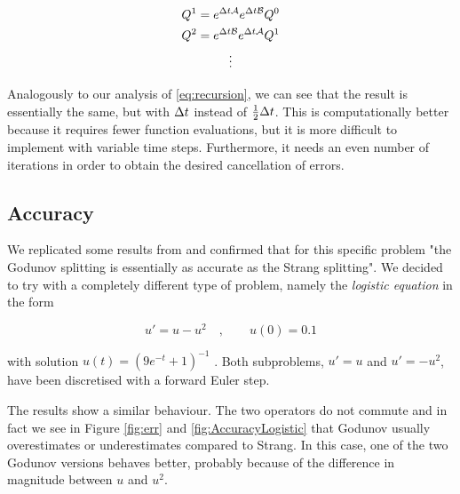 \documentclass[journal,onecolumn]{IEEEtran}
\begin{document}
\begin{equation}
	\begin{gathered}
		Q^1 = e^{\Delta t\mathcal{A}}e^{\Delta t\mathcal{B}}Q^0\\
		Q^2 = e^{\Delta t\mathcal{B}}e^{\Delta t\mathcal{A}}Q^1\\
		\vdots
	\end{gathered}
\end{equation}

Analogously to our analysis of \eqref{eq:recursion}, we can see that the result is essentially the same, but with $\Delta t$ instead of $\frac{1}{2}\Delta t$. This is computationally better because it requires fewer function evaluations, but it is more difficult to implement with variable time steps. Furthermore, it needs an even number of iterations in order to obtain the desired cancellation of errors.

\subsection{Accuracy}

We replicated some results from \cite{leveque} and confirmed that for this specific problem "the Godunov splitting is essentially as accurate as the Strang splitting". We decided to try with a completely different type of problem, namely the \textit{logistic equation} in the form

\begin{equation}
	u' = u-u^2\quad,\qquad u(0)=0.1
\end{equation}

with solution $u(t)=(9e^{-t}+1)^{-1}$ \cite{logistic}. Both subproblems, $u'=u$ and $u'=-u^{2}$, have been discretised with a forward Euler step.

The results show a similar behaviour. The two operators do not commute and in fact we see in Figure \ref{fig:err} and \ref{fig:AccuracyLogistic} that Godunov usually overestimates or underestimates compared to Strang. In this case, one of the two Godunov versions behaves better, probably because of the difference in magnitude between $u$ and $u^2$.
\end{document}
